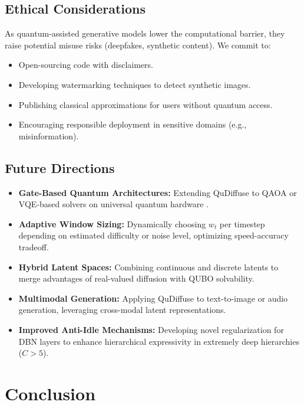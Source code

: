 \documentclass[11pt,letterpaper]{article}
\begin{document}
\subsection{Ethical Considerations}
As quantum-assisted generative models lower the computational barrier, they raise potential misuse risks (deepfakes, synthetic content). We commit to:
\begin{itemize}[noitemsep,topsep=0pt]
    \item Open-sourcing code with disclaimers.
    \item Developing watermarking techniques \cite{yu2019attributing} to detect synthetic images.
    \item Publishing classical approximations for users without quantum access.
    \item Encouraging responsible deployment in sensitive domains (e.g., misinformation).
\end{itemize}

\subsection{Future Directions}
\begin{itemize}[noitemsep,topsep=0pt]
    \item \textbf{Gate-Based Quantum Architectures:} Extending QuDiffuse to QAOA or VQE-based solvers on universal quantum hardware \cite{cerezo2021variational}.
    \item \textbf{Adaptive Window Sizing:} Dynamically choosing $w_t$ per timestep depending on estimated difficulty or noise level, optimizing speed-accuracy tradeoff.
    \item \textbf{Hybrid Latent Spaces:} Combining continuous and discrete latents to merge advantages of real-valued diffusion with QUBO solvability.
    \item \textbf{Multimodal Generation:} Applying QuDiffuse to text-to-image or audio generation, leveraging cross-modal latent representations.
    \item \textbf{Improved Anti-Idle Mechanisms:} Developing novel regularization for DBN layers to enhance hierarchical expressivity in extremely deep hierarchies ($C>5$).
\end{itemize}

\section{Conclusion}
\label{sec:conclusion}
\end{document}
